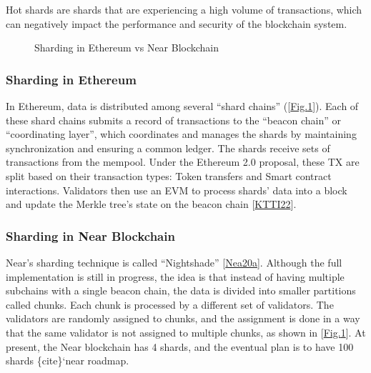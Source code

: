\documentclass[letterpaper,10pt,english]{jupyterBook}
\let\sphinxpxdimen\pdfpxdimen\else\newdimen\sphinxpxdimen
\begin{document}
\begin{sphinxShadowBox}

\sphinxAtStartPar
Hot shards are shards that are experiencing a high volume of transactions, which can negatively impact the performance and security of the blockchain system.
\end{sphinxShadowBox}

\begin{figure}[htbp]
\centering
\capstart

\noindent\sphinxincludegraphics[width=720\sphinxpxdimen,height=330\sphinxpxdimen]{{sharding}.png}
\caption{Sharding in Ethereum vs Near Blockchain}\label{\detokenize{SHARDING/sharding:sharding-eth-near}}\end{figure}


\subsubsection{Sharding in Ethereum}
\label{\detokenize{SHARDING/sharding:sharding-in-ethereum}}
\sphinxAtStartPar
In Ethereum, data is distributed among several “shard chains” ({[}\hyperref[\detokenize{SHARDING/sharding:sharding-eth-near}]{Fig.\@ \ref{\detokenize{SHARDING/sharding:sharding-eth-near}}}{]}). Each of these shard chains submits a record of transactions to the “beacon chain” or “coordinating layer”, which coordinates and manages the shards by maintaining synchronization and ensuring a common ledger. The shards receive sets of transactions from the mempool. Under the Ethereum 2.0 proposal, these TX are split based on their transaction types: Token transfers and Smart contract interactions. Validators then use an EVM to process shards’ data into a block and update the Merkle tree’s state on the beacon chain {[}\hyperlink{cite.SHARDING/sharding:id67}{KTTI22}{]}.


\subsubsection{Sharding in Near Blockchain}
\label{\detokenize{SHARDING/sharding:sharding-in-near-blockchain}}
\sphinxAtStartPar
Near’s sharding technique is called “Nightshade” {[}\hyperlink{cite.SHARDING/sharding:id65}{Nea20a}{]}. Although the full implementation is still in progress, the idea is that instead of having multiple subchains with a single beacon chain, the data is divided into smaller partitions called chunks. Each chunk is processed by a different set of validators. The validators are randomly assigned to chunks, and the assignment is done in a way that the same validator is not assigned to multiple chunks, as shown in {[}\hyperref[\detokenize{SHARDING/sharding:sharding-eth-near}]{Fig.\@ \ref{\detokenize{SHARDING/sharding:sharding-eth-near}}}{]}. At present, the Near blockchain has 4 shards, and the eventual plan is to have 100 shards \{cite\}`near roadmap.
\end{document}
